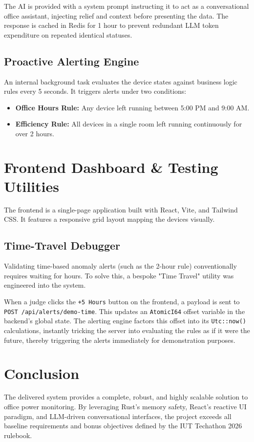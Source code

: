\documentclass[12pt,a4paper]{article}
\begin{document}
The AI is provided with a system prompt instructing it to act as a conversational office assistant, injecting relief and context before presenting the data. The response is cached in Redis for 1 hour to prevent redundant LLM token expenditure on repeated identical statuses.

\subsection{Proactive Alerting Engine}
An internal background task evaluates the device states against business logic rules every 5 seconds. It triggers alerts under two conditions:
\begin{itemize}
    \item \textbf{Office Hours Rule:} Any device left running between 5:00 PM and 9:00 AM.
    \item \textbf{Efficiency Rule:} All devices in a single room left running continuously for over 2 hours.
\end{itemize}

\section{Frontend Dashboard \& Testing Utilities}
The frontend is a single-page application built with React, Vite, and Tailwind CSS. It features a responsive grid layout mapping the devices visually.

\subsection{Time-Travel Debugger}
Validating time-based anomaly alerts (such as the 2-hour rule) conventionally requires waiting for hours. To solve this, a bespoke "Time Travel" utility was engineered into the system. 

When a judge clicks the \texttt{+5 Hours} button on the frontend, a payload is sent to \texttt{POST /api/alerts/demo-time}. This updates an \texttt{AtomicI64} offset variable in the backend's global state. The alerting engine factors this offset into its \texttt{Utc::now()} calculations, instantly tricking the server into evaluating the rules as if it were the future, thereby triggering the alerts immediately for demonstration purposes.

\section{Conclusion}
The delivered system provides a complete, robust, and highly scalable solution to office power monitoring. By leveraging Rust's memory safety, React's reactive UI paradigm, and LLM-driven conversational interfaces, the project exceeds all baseline requirements and bonus objectives defined by the IUT Techathon 2026 rulebook.
\end{document}
